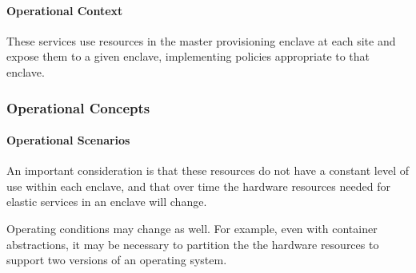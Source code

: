 \paragraph{Operational Context}

These services use resources in the master provisioning enclave at each site and expose them
to a given enclave, implementing policies appropriate to that enclave.

\subsubsection{Operational Concepts}

\paragraph{Operational Scenarios}

An important consideration is that these resources do not have a constant
level of use within each enclave, and that over time the hardware resources
needed for elastic services in an enclave will change.

Operating conditions may change as well. For example, even with container
abstractions, it may be necessary to partition the the hardware resources  to
support two versions of an operating system.